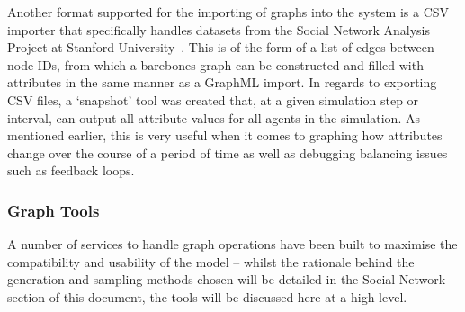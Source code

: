 \documentclass[]{report}
\begin{document}
Another format supported for the importing of graphs into the system is a CSV importer that specifically handles datasets from the Social Network Analysis Project at Stanford University~\cite{SNAP}. This is of the form of a list of edges between node IDs, from which a barebones graph can be constructed and filled with attributes in the same manner as a GraphML import. In regards to exporting CSV files, a `snapshot' tool was created that, at a given simulation step or interval, can output all attribute values for all agents in the simulation. As mentioned earlier, this is very useful when it comes to graphing how attributes change over the course of a period of time as well as debugging balancing issues such as feedback loops.

\subsubsection{Graph Tools}
A number of services to handle graph operations have been built to maximise the compatibility and usability of the model – whilst the rationale behind the generation and sampling methods chosen will be detailed in the Social Network section of this document, the tools will be discussed here at a high level.
\end{document}
